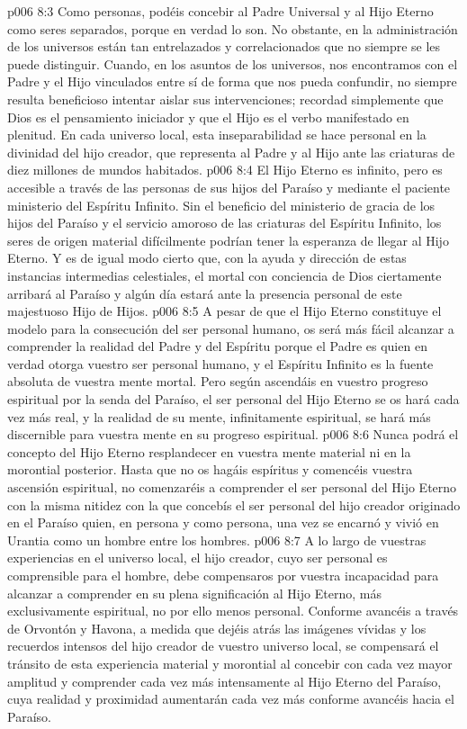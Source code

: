 \vs p006 8:3 Como personas, podéis concebir al Padre Universal y al Hijo Eterno como seres separados, porque en verdad lo son. No obstante, en la administración de los universos están tan entrelazados y correlacionados que no siempre se les puede distinguir. Cuando, en los asuntos de los universos, nos encontramos con el Padre y el Hijo vinculados entre sí de forma que nos pueda confundir, no siempre resulta beneficioso intentar aislar sus intervenciones; recordad simplemente que Dios es el pensamiento iniciador y que el Hijo es el verbo manifestado en plenitud. En cada universo local, esta inseparabilidad se hace personal en la divinidad del hijo creador, que representa al Padre y al Hijo ante las criaturas de diez millones de mundos habitados.
\vs p006 8:4 El Hijo Eterno es infinito, pero es accesible a través de las personas de sus hijos del Paraíso y mediante el paciente ministerio del Espíritu Infinito. Sin el beneficio del ministerio de gracia de los hijos del Paraíso y el servicio amoroso de las criaturas del Espíritu Infinito, los seres de origen material difícilmente podrían tener la esperanza de llegar al Hijo Eterno. Y es de igual modo cierto que, con la ayuda y dirección de estas instancias intermedias celestiales, el mortal con conciencia de Dios ciertamente arribará al Paraíso y algún día estará ante la presencia personal de este majestuoso Hijo de Hijos.
\vs p006 8:5 \pc A pesar de que el Hijo Eterno constituye el modelo para la consecución del ser personal humano, os será más fácil alcanzar a comprender la realidad del Padre y del Espíritu porque el Padre es quien en verdad otorga vuestro ser personal humano, y el Espíritu Infinito es la fuente absoluta de vuestra mente mortal. Pero según ascendáis en vuestro progreso espiritual por la senda del Paraíso, el ser personal del Hijo Eterno se os hará cada vez más real, y la realidad de su mente, infinitamente espiritual, se hará más discernible para vuestra mente en su progreso espiritual.
\vs p006 8:6 Nunca podrá el concepto del Hijo Eterno resplandecer en vuestra mente material ni en la morontial posterior. Hasta que no os hagáis espíritus y comencéis vuestra ascensión espiritual, no comenzaréis a comprender el ser personal del Hijo Eterno con la misma nitidez con la que concebís el ser personal del hijo creador originado en el Paraíso quien, en persona y como persona, una vez se encarnó y vivió en Urantia como un hombre entre los hombres.
\vs p006 8:7 A lo largo de vuestras experiencias en el universo local, el hijo creador, cuyo ser personal es comprensible para el hombre, debe compensaros por vuestra incapacidad para alcanzar a comprender en su plena significación al Hijo Eterno, más exclusivamente espiritual, no por ello menos personal. Conforme avancéis a través de Orvontón y Havona, a medida que dejéis atrás las imágenes vívidas y los recuerdos intensos del hijo creador de vuestro universo local, se compensará el tránsito de esta experiencia material y morontial al concebir con cada vez mayor amplitud y comprender cada vez más intensamente al Hijo Eterno del Paraíso, cuya realidad y proximidad aumentarán cada vez más conforme avancéis hacia el Paraíso.
